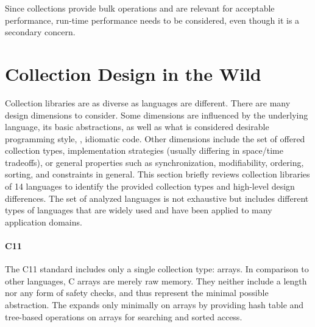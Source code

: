 \documentclass[sigconf, authorversion]{acmart}
\def\LangCnt{14\xspace}
\begin{document}
Since collections provide bulk operations
and are relevant for acceptable performance,
run-time performance needs to be considered,
even though it is a secondary concern.

\section{Collection Design in the Wild}
\label{sec:col-wild}


Collection libraries are as diverse as languages are different.
There are many design dimensions to consider.
Some dimensions are influenced by the underlying language,
its basic abstractions,
as well as what is considered desirable programming style, \ie, idiomatic code.
Other dimensions include the set of offered collection types,
implementation strategies (usually differing in space/time tradeoffs),
or general properties such as synchronization, modifiability, ordering,
sorting, and constraints in general.
%
This section briefly reviews collection libraries of \LangCnt languages
to identify the provided collection types
and high-level design differences.
The set of analyzed languages is not exhaustive but includes different types of languages
that are widely used and have been applied to many application domains.

\paragraph{C11}


The C11 standard includes only a single collection type: arrays.
In comparison to other languages, C arrays are merely raw memory.
They neither include a length nor any form of safety checks,
and thus represent the minimal possible abstraction.
The 
expands only minimally on arrays
by providing hash table and tree-based operations on arrays
for searching and sorted access.
\end{document}

